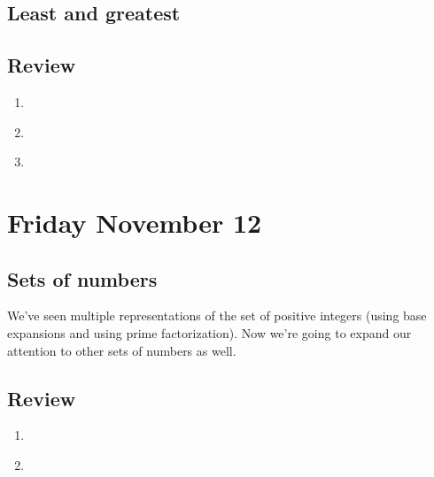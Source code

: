 \subsection*{Least and greatest}


\newpage
\subsection*{Review}
\begin{enumerate}
\item \hspace{1in}\\ 
\item \hspace{1in}\\ 
\item \hspace{1in}\\ 
\end{enumerate}

\newpage
\section*{Friday November 12}






\newpage
\subsection*{Sets of numbers}

We've seen multiple representations of the set of positive integers
(using base expansions and using prime factorization). Now we're 
going to expand our attention to other sets of numbers as well.




\newpage
\subsection*{Review}
\begin{enumerate}
\item \hspace{1in}\\ 
\newpage
\item \hspace{1in}\\ 
\end{enumerate}

